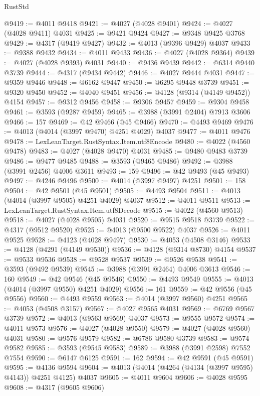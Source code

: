 \begin{lexlean}{RustStd}
\begin{coremodule}
@9419 := @4011 @9418
@9421 := @4027 (@4028 @9401)
@9424 := @4027 (@4028 @9411) @4031
@9425 := @9421 @9424
@9427 := @9348 @9425 @3768
@9429 := @4317 (@9419 @9427)
@9432 := @4013 (@9396 @9429) @4037
@9433 := @9388 @9432
@9434 := @4011 @9433
@9436 := @4027 (@4028 @9364)
@9439 := @4027 (@4028 @9393) @4031
@9440 := @9436 @9439
@9442 := @6314 @9440 @3739
@9444 := @4317 (@9434 @9442)
@9446 := @4027 @9444 @4031
@9447 := @9359 @9446
@9448 := @6162 @9447
@9450 := @6295 @9448 @3739
@9451 := @9320 @9450
@9452 := @4040 @9451
@9456 := @4128 (@9314 (@4149 @9452)) @4154
@9457 := @9312 @9456
@9458 := @9306 @9457
@9459 := @9304 @9458
@9461 := @3593 (@9287 @9459)
@9465 := @3988 (@3991 @2404) @7913 @3606
@9466 := 157
@9469 := @42 @9466 (@45 @9466)
@9470 := @4493 @9469
@9476 := @4013 (@4014 (@3997 @9470) @4251 @4029) @4037
@9477 := @4011 @9476
@9478 := LexLeanTarget.RustSyntax.Item.utf8Encode
@9480 := @4022 (@4560 @9478)
@9483 := @4027 (@4028 @9470) @4031
@9485 := @9480 @9483 @3739
@9486 := @9477 @9485
@9488 := @3593 (@9465 @9486)
@9492 := @3988 (@3991 @2456) @4006 @3611
@9493 := 159
@9496 := @42 @9493 (@45 @9493)
@9497 := @4246 @9496
@9500 := @4014 (@3997 @9497) @4251
@9501 := 158
@9504 := @42 @9501 (@45 @9501)
@9505 := @4493 @9504
@9511 := @4013 (@4014 (@3997 @9505) @4251 @4029) @4037
@9512 := @4011 @9511
@9513 := LexLeanTarget.RustSyntax.Item.utf8Decode
@9515 := @4022 (@4560 @9513)
@9518 := @4027 (@4028 @9505) @4031
@9520 := @9515 @9518 @3739
@9522 := @4317 (@9512 @9520)
@9525 := @4013 (@9500 @9522) @4037
@9526 := @4011 @9525
@9528 := @4123 (@4028 @9497)
@9530 := @4053 (@4508 @3146)
@9533 := @4128 (@4291 (@4149 @9530))
@9536 := @4128 (@9314 @8730) @4154
@9537 := @9533 @9536
@9538 := @9528 @9537
@9539 := @9526 @9538
@9541 := @3593 (@9492 @9539)
@9545 := @3988 (@3991 @2464) @4006 @3613
@9546 := 160
@9549 := @42 @9546 (@45 @9546)
@9550 := @4493 @9549
@9555 := @4013 (@4014 (@3997 @9550) @4251 @4029)
@9556 := 161
@9559 := @42 @9556 (@45 @9556)
@9560 := @4493 @9559
@9563 := @4014 (@3997 @9560) @4251
@9565 := @4053 (@4508 @3157)
@9567 := @4027 @9565 @4031
@9569 := @6769 @9567 @3739
@9572 := @4013 (@9563 @9569) @4037
@9573 := @9555 @9572
@9574 := @4011 @9573
@9576 := @4027 (@4028 @9550)
@9579 := @4027 (@4028 @9560) @4031
@9580 := @9576 @9579
@9582 := @6786 @9580 @3739
@9583 := @9574 @9582
@9585 := @3593 (@9545 @9583)
@9589 := @3988 (@3991 @2598) @7552 @7554
@9590 := @6147 @6125
@9591 := 162
@9594 := @42 @9591 (@45 @9591)
@9595 := @4136 @9594
@9604 := @4013 (@4014 (@4264 (@4134 (@3997 @9595) @4143)) @4251 @4125) @4037
@9605 := @4011 @9604
@9606 := @4028 @9595
@9608 := @4317 (@9605 @9606)

\end{coremodule}
\end{lexlean}
